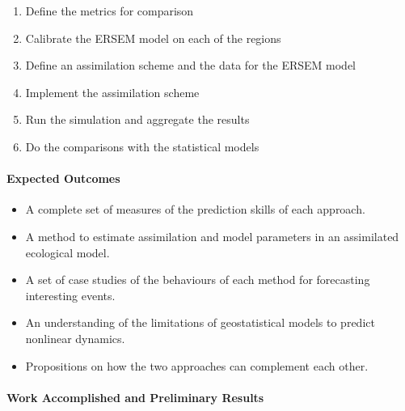 \begin{enumerate}
\item Define the metrics for comparison
\item Calibrate the ERSEM model on each of the regions
\item Define an assimilation scheme and the data for the ERSEM model
\item Implement the assimilation scheme
\item Run the simulation and aggregate the results
\item Do the comparisons with the statistical models
\end{enumerate}

\paragraph{Expected Outcomes}

\begin{itemize}
\item A complete set of measures of the prediction skills of each approach.
\item A method to estimate assimilation and model parameters in an assimilated ecological model.
\item A set of case studies of the behaviours of each method for forecasting interesting events.
\item An understanding of the limitations of geostatistical models to predict nonlinear dynamics. 
\item Propositions on how the two approaches can complement each other.
\end{itemize}

\paragraph{Work Accomplished and Preliminary Results}

